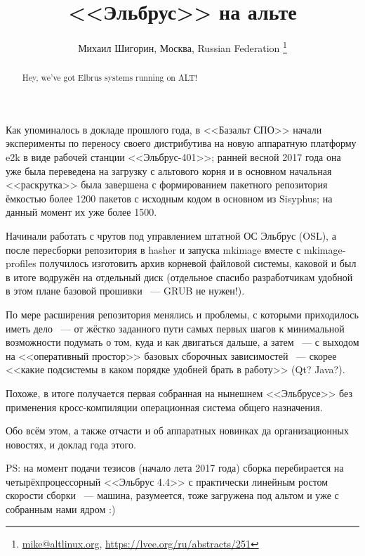 \documentclass[10pt, a5paper]{article}
\begin{document}
\title{<<Эльбрус>> на альте}
\author{Михаил Шигорин, Москва, Russian Federation \footnote{\url{mike@altlinux.org}, \url {https://lvee.org/ru/abstracts/251}}}
\maketitle
\begin{abstract}
Hey, we've got Elbrus systems running on ALT!
\end{abstract}
Как упоминалось в докладе прошлого года, в <<Базальт СПО>> начали эксперименты по переносу своего дистрибутива на новую аппаратную платформу e2k в виде рабочей станции <<Эльбрус-401>>; ранней весной 2017 года она уже была переведена на загрузку с альтового корня и в основном начальная <<раскрутка>> была завершена с формированием пакетного репозитория ёмкостью более 1200 пакетов с исходным кодом в основном из Sisyphus; на данный момент их уже более 1500.

Начинали работать с чрутов под управлением штатной ОС Эльбрус (OSL), а после пересборки репозитория в hasher и запуска mkimage вместе с mkimage-profiles получилось изготовить архив корневой файловой системы, каковой и был в итоге водружён на отдельный диск (отдельное спасибо разработчикам удобной в этом плане базовой прошивки ~--- GRUB не нужен!).

По мере расширения репозитория менялись и проблемы, с которыми приходилось иметь дело ~--- от жёстко заданного пути самых первых шагов к минимальной возможности подумать о том, куда и как двигаться дальше, а затем ~--- с выходом на <<оперативный простор>> базовых сборочных зависимостей ~--- скорее <<какие подсистемы в каком порядке удобней брать в работу>> (Qt? Java?).

Похоже, в итоге получается первая собранная на нынешнем <<Эльбрусе>> без применения кросс-компиляции операционная система общего назначения.

Обо всём этом, а также отчасти и об аппаратных новинках да организационных новостях, и доклад года этого.

PS: на момент подачи тезисов (начало лета 2017 года) сборка перебирается на четырёхпроцессорный <<Эльбрус 4.4>> с практически линейным ростом скорости сборки ~--- машина, разумеется, тоже загружена под альтом и уже с собранным нами ядром :)
\end{document}
